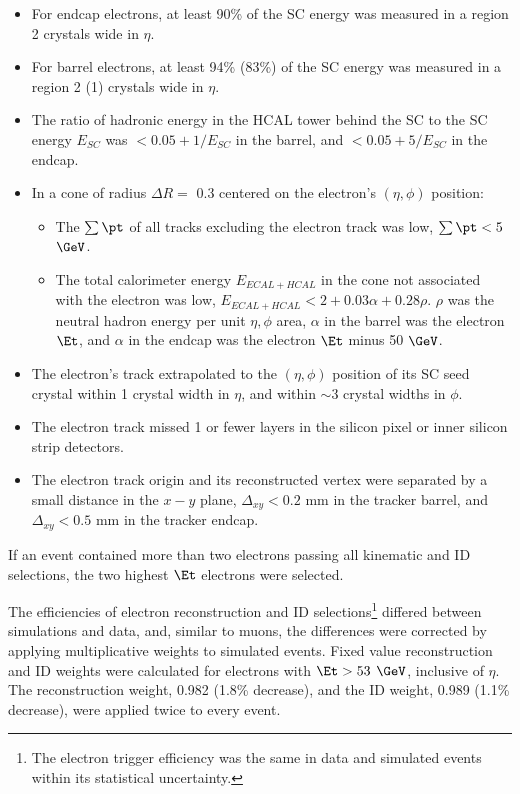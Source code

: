 \begin{itemize}
	\item For endcap electrons, at least 90\% of the SC energy was measured in a region 2 crystals wide in $\eta$.
	\item For barrel electrons, at least 94\% (83\%) of the SC energy was measured in a region 2 (1) crystals wide 
		in $\eta$.
	\item The ratio of hadronic energy in the HCAL tower behind the SC to the SC energy $E_{SC}$ was $< 0.05 + 1/E_{SC}$ 
		in the barrel, and $< 0.05 + 5/E_{SC}$ in the endcap.
	\item In a cone of radius $\Delta R =$ 0.3 centered on the electron's $(\eta, \phi)$ position:
	\begin{itemize}
		\item The $\sum \pt$ of all tracks excluding the electron track was low, $\sum \pt < 5$ $\GeV$.
		\item The total calorimeter energy $E_{ECAL + HCAL}$ in the cone not associated with the electron was low, 
			$E_{ECAL + HCAL} < 2 + 0.03\alpha + 0.28\rho$.  $\rho$ was the neutral hadron energy per unit $\eta,\phi$ area, 
			$\alpha$ in the barrel was the electron $\Et$, and $\alpha$ in the endcap was the electron $\Et$ minus 50 $\GeV$.
	\end{itemize}
	\item The electron's track extrapolated to the $(\eta, \phi)$ position of its SC seed crystal within 1 crystal width in 
		$\eta$, and within $\sim$3 crystal widths in $\phi$.
	\item The electron track missed 1 or fewer layers in the silicon pixel or inner silicon strip detectors.
	\item The electron track origin and its reconstructed vertex were separated by a small distance in the $x-y$ plane, 
		$\Delta_{xy} < 0.2$ mm in the tracker barrel, and $\Delta_{xy} < 0.5$ mm in the tracker endcap.
\end{itemize}

If an event contained more than two electrons passing all kinematic and ID selections, the two highest $\Et$ 
electrons were selected.

The efficiencies of electron reconstruction and ID selections\footnote{The electron trigger efficiency was the same 
in data and simulated events within its statistical uncertainty.} differed between simulations and data, and, similar 
to muons, the differences were corrected by applying multiplicative weights to simulated events.  Fixed value reconstruction 
and ID weights were calculated for electrons with $\Et > 53$ $\GeV$, inclusive of $\eta$.  The reconstruction 
weight, 0.982 (1.8\% decrease), and the ID weight, 0.989 (1.1\% decrease), were applied twice to every event.


